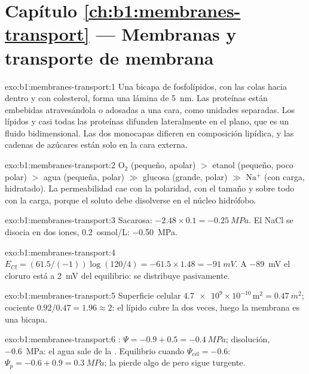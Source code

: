 \section*{Capítulo \ref{ch:b1:membranes-transport} --- Membranas y transporte de membrana}

\begin{solution}{exo:b1:membranes-transport:1}
Una bicapa de fosfolípidos, con las colas hacia dentro y con colesterol,
forma una lámina de \qty{5}{nm}. Las proteínas están embebidas
atravesándola o adosadas a una cara, como unidades separadas. Los lípidos y
casi todas las proteínas difunden lateralmente en el plano, que es un fluido
bidimensional. Las dos monocapas difieren en composición lipídica, y las
cadenas de azúcares están solo en la cara externa.
\end{solution}

\begin{solution}{exo:b1:membranes-transport:2}
$\mathrm{O_2}$ (pequeño, apolar) $>$ etanol (pequeño, poco polar)
$>$ agua (pequeña, polar) $\gg$ glucosa (grande, polar) $\gg$
$\mathrm{Na^+}$ (con carga, hidratado). La permeabilidad cae con la
polaridad, con el tamaño y sobre todo con la carga, porque el soluto debe
disolverse en el núcleo hidrófobo.
\end{solution}

\begin{solution}{exo:b1:membranes-transport:3}
Sacarosa: $-2.48\times 0.1 = \qty{-0.25}{MPa}$. El NaCl se disocia en dos
iones, \qty{0.2}{osmol/L}: \qty{-0.50}{MPa}.
\end{solution}

\begin{solution}{exo:b1:membranes-transport:4}
$E_{Cl} = (61.5/(-1))\log(120/4) = -61.5\times 1.48 = \qty{-91}{mV}$. A
\qty{-89}{mV} el cloruro está a \qty{2}{mV} del equilibrio: se distribuye
pasivamente.
\end{solution}

\begin{solution}{exo:b1:membranes-transport:5}
Superficie celular $\num{4.7e9}\times 10^{-10}\,\mathrm{m^2} =
\qty{0.47}{m^2}$; cociente $0.92/0.47 = 1.96 \approx 2$: el lípido cubre la
 dos veces, luego la membrana es una bicapa.
\end{solution}

\begin{solution}{exo:b1:membranes-transport:6}
: $\Psi = -0.9 + 0.5 = \qty{-0.4}{MPa}$; disolución, \qty{-0.6}{MPa}:
el agua sale de la . Equilibrio cuando $\Psi_{\text{cél}} = -0.6$:
$\Psi_p = -0.6 + 0.9 = \qty{0.3}{MPa}$; la  pierde algo de 
pero sigue turgente.
\end{solution}

